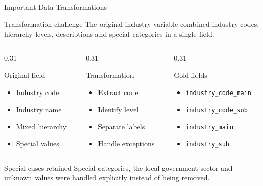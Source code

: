 \documentclass[aspectratio=169]{beamer}
\begin{document}
\begin{frame}{Important Data Transformations} \small \begin{block}{Transformation challenge} The original industry variable combined industry codes, hierarchy levels, descriptions and special categories in a single field. \end{block} \vspace{0.0cm} \begin{columns}[T,onlytextwidth] \begin{column}{0.31\textwidth} \begin{block}{Original field} \begin{itemize} \setlength{\itemsep}{0.12cm} \item Industry code \item Industry name \item Mixed hierarchy \item Special values \end{itemize} \end{block} \end{column} \begin{column}{0.31\textwidth} \begin{block}{Transformation} \begin{itemize} \setlength{\itemsep}{0.12cm} \item Extract code \item Identify level \item Separate labels \item Handle exceptions \end{itemize} \end{block} \end{column} \begin{column}{0.31\textwidth} \begin{block}{Gold fields} \begin{itemize} \setlength{\itemsep}{0.12cm} \item \texttt{industry\_code\_main} \item \texttt{industry\_code\_sub} \item \texttt{industry\_main} \item \texttt{industry\_sub} \end{itemize} \end{block} \end{column} \end{columns} \vspace{0.0cm} \begin{alertblock}{Special cases retained} Special categories, the local government sector and unknown values were handled explicitly instead of being removed. \end{alertblock} \end{frame}
\end{document}
